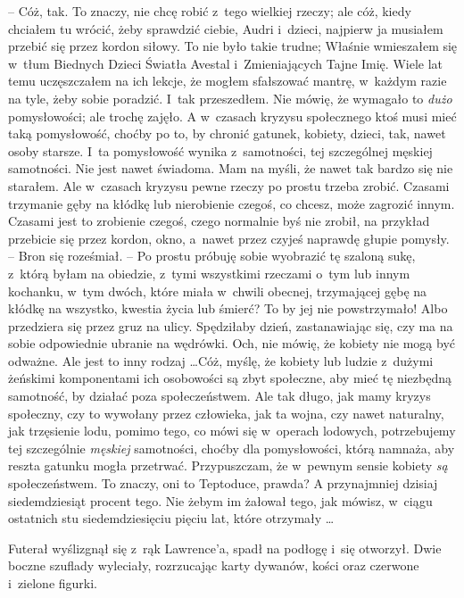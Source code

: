 \documentclass[oneside,polish,11pt,rmheadings]{mwbk}
\begin{document}
-- Cóż, tak. To znaczy, nie chcę robić z~tego wielkiej rzeczy; ale cóż, kiedy chciałem tu wrócić, żeby sprawdzić ciebie, Audri i~dzieci, najpierw ja musiałem przebić się przez kordon siłowy. To nie było takie trudne; Właśnie wmieszałem się w~tłum Biednych Dzieci Światła Avestal i~Zmieniających Tajne Imię. Wiele lat temu uczęszczałem na ich lekcje, że mogłem sfałszować mantrę, w~każdym razie na tyle, żeby sobie poradzić. I~tak przeszedłem. Nie mówię, że wymagało to \textit{dużo }pomysłowości; ale trochę zajęło. A w~czasach kryzysu społecznego ktoś musi mieć taką pomysłowość, choćby po to, by chronić gatunek, kobiety, dzieci, tak, nawet osoby starsze. I~ta pomysłowość wynika z~samotności, tej szczególnej męskiej samotności. Nie jest nawet świadoma. Mam na myśli, że nawet tak bardzo się nie starałem. Ale w~czasach kryzysu pewne rzeczy po prostu trzeba zrobić. Czasami trzymanie gęby na kłódkę lub nierobienie czegoś, co chcesz, może zagrozić innym. Czasami jest to zrobienie czegoś, czego normalnie byś nie zrobił, na przykład przebicie się przez kordon, okno, a~nawet przez czyjeś naprawdę głupie pomysły. -- Bron się roześmiał. -- Po prostu próbuję sobie wyobrazić tę szaloną sukę, z~którą byłam na obiedzie, z~tymi wszystkimi rzeczami o~tym lub innym kochanku, w~tym dwóch, które miała w~chwili obecnej, trzymającej gębę na kłódkę na wszystko, kwestia życia lub śmierć? To by jej nie powstrzymało! Albo przedziera się przez gruz na ulicy. Spędziłaby dzień, zastanawiając się, czy ma na sobie odpowiednie ubranie na wędrówki. Och, nie mówię, że kobiety nie mogą być odważne. Ale jest to inny rodzaj \ldots  Cóż, myślę, że kobiety lub ludzie z~dużymi żeńskimi komponentami ich osobowości są zbyt społeczne, aby mieć tę niezbędną samotność, by działać poza społeczeństwem. Ale tak długo, jak mamy kryzys społeczny, czy to wywołany przez człowieka, jak ta wojna, czy nawet naturalny, jak trzęsienie lodu, pomimo tego, co mówi się w~operach lodowych, potrzebujemy tej szczególnie \textit{męskiej } samotności, choćby dla pomysłowości, którą namnaża, aby reszta gatunku mogła przetrwać. Przypuszczam, że w~pewnym sensie kobiety \textit{są }społeczeństwem. To znaczy, oni to Teptoduce, prawda? A przynajmniej dzisiaj siedemdziesiąt procent tego. Nie żebym im żałował tego, jak mówisz, w~ciągu ostatnich stu siedemdziesięciu pięciu lat, które otrzymały \ldots  

Futerał wyślizgnął się z~rąk Lawrence'a, spadł na podłogę i~się otworzył. Dwie boczne szuflady wyleciały, rozrzucając karty dywanów, kości oraz czerwone i~zielone figurki. 
\end{document}

